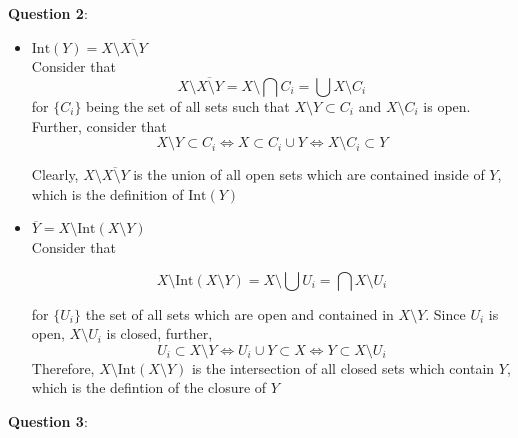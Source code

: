 \documentclass{article} %
\newcommand{\question}[2][]{
  \begin{flushleft}
    \textbf{Question #1}: \textit{#2}

\end{flushleft}}
\begin{document}
\question[2]{}
\begin{itemize}
  \item $\text{Int}(Y) = X \setminus \overline{X \setminus Y}$\\
    Consider that
    \[
      X \setminus \overline{X\setminus Y} = X \setminus \bigcap C_i =
      \bigcup X \setminus C_i
    \]
    for $\{C_i\}$ being the set of all sets such that $X\setminus Y
    \subset C_i$ and $X \setminus C_i$ is open. Further, consider that
    \[
      X \setminus Y \subset C_i \iff X \subset C_i
      \cup Y \iff X \setminus C_i \subset Y
    \]

    Clearly, $X \setminus \overline{X \setminus Y}$ is the union of
    all open sets which are contained inside of $Y$, which is the
    definition of $\text{Int}(Y)$
  \item $\overline Y = X \setminus \text{Int}(X\setminus Y)$\\
    Consider that

    \[
      X \setminus \text{Int}(X\setminus Y) = X \setminus \bigcup U_i
      = \bigcap X \setminus U_i
    \]

    for $\{U_i\}$ the set of all sets which are open and contained in $X
    \setminus Y$. Since $U_i$ is open, $X \setminus U_i$ is closed, further,
    \[
      U_i \subset X \setminus  Y \iff U_i \cup Y \subset X
      \iff Y \subset X \setminus U_i
    \]
    Therefore, $X \setminus \text{Int}(X \setminus Y)$ is the
    intersection of all closed sets which contain $Y$, which is the
    defintion of the closure of $Y$
\end{itemize}
\question[3]{}
\end{document}
